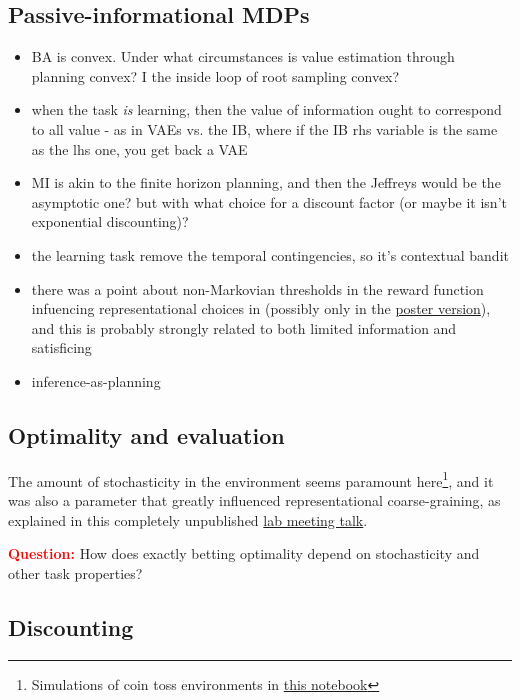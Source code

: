 \documentclass{article}
\newcommand{\Q}{\textcolor{red}{\textbf{Question: }}}
\begin{document}
\subsection{Passive-informational MDPs}

\begin{itemize}
    \item BA is convex. Under what circumstances is value estimation through planning convex? I the inside loop of root sampling convex?
    \item when the task \emph{is} learning, then the value of information ought to correspond to all value - as in VAEs vs. the IB, where if the IB rhs variable is the same as the lhs one, you get back a VAE
    \item MI is akin to the finite horizon planning, and then the Jeffreys would be the asymptotic one? but with what choice for a discount factor (or maybe it isn’t exponential discounting)?
    \item the learning task remove the temporal contingencies, so it's contextual bandit
    \item there was a point about non-Markovian thresholds in the reward function infuencing representational choices in \cite{shen2023meta} (possibly only in the \href{https://github.com/mihalybanyai/infomax/blob/main/ccn2023_poster_replan2.pdf}{poster version}), and this is probably strongly related to both limited information and satisficing\cite{arumugam2021deciding}
    \item inference-as-planning \cite{buesing2020}
    
\end{itemize}

\subsection{Optimality and evaluation}

The amount of stochasticity in the environment seems paramount here\footnote{Simulations of coin toss environments in \href{https://github.com/mihalybanyai/infomax/blob/main/infomax_class.py}{this notebook}}, and it was also a parameter that greatly influenced representational coarse-graining, as explained in this completely unpublished \href{https://github.com/mihalybanyai/infomax/blob/main/LM_221130_beliefs_and_representations.pdf}{lab meeting talk}.

\Q How does exactly betting optimality depend on stochasticity and other task properties? 

\subsection{Discounting}
\end{document}
